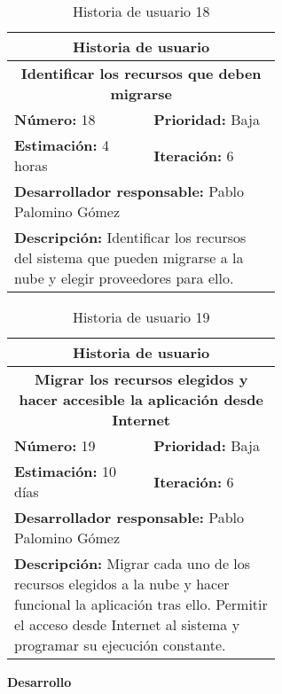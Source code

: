 \begin{table}[H]
        \centering
        \begin{tabular}{|p{0.3\linewidth}|p{0.3\linewidth}|}
          \hline
          \multicolumn{2}{|c|}{Historia de usuario}\\ \hline
          \multicolumn{2}{|c|}{\textbf{Identificar los recursos que deben migrarse}}\\ \hline
          \textbf{Número:} 18 & \textbf{Prioridad:} Baja\\ \hline
          \textbf{Estimación:} 4 horas & \textbf{Iteración:} 6\\ \hline
          \multicolumn{2}{|l|}{\textbf{Desarrollador responsable:} Pablo Palomino Gómez}\\ \hline
          \multicolumn{2}{|p{0.6\linewidth}|}{\textbf{Descripción:} Identificar los recursos del sistema que pueden migrarse a la nube y elegir proveedores para ello.}\\ \hline
        \end{tabular}
        \caption{Historia de usuario 18}
        \label{tab:hist18}
\end{table}
\begin{table}[H]
        \centering
        \begin{tabular}{|p{0.3\linewidth}|p{0.3\linewidth}|}
          \hline
          \multicolumn{2}{|c|}{Historia de usuario}\\ \hline
          \multicolumn{2}{|c|}{\textbf{Migrar los recursos elegidos y hacer accesible la aplicación desde Internet}}\\ \hline
          \textbf{Número:} 19 & \textbf{Prioridad:} Baja\\ \hline
          \textbf{Estimación:} 10 días & \textbf{Iteración:} 6\\ \hline
          \multicolumn{2}{|l|}{\textbf{Desarrollador responsable:} Pablo Palomino Gómez}\\ \hline
          \multicolumn{2}{|p{0.6\linewidth}|}{\textbf{Descripción:} Migrar cada uno de los recursos elegidos a la nube y hacer funcional la aplicación tras ello. Permitir el acceso desde Internet al sistema y programar su ejecución constante.}\\ \hline
        \end{tabular}
        \caption{Historia de usuario 19}
        \label{tab:hist19}
\end{table}
\textbf{Desarrollo}\\


